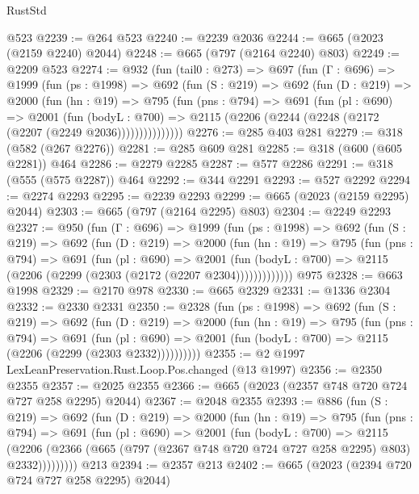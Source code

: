 \begin{lexlean}{RustStd}
\begin{coremodule}
    @523
@2239 := @264 @523
@2240 := @2239 @2036
@2244 := @665 (@2023 (@2159 @2240) @2044)
@2248 := @665 (@797 (@2164 @2240) @803)
@2249 := @2209 @523
@2274 := @932
    (fun (tail0 : @273) =>
    @697
      (fun (Γ : @696) =>
      @1999
        (fun (ps : @1998) =>
        @692
          (fun (S : @219) =>
          @692
            (fun (D : @219) =>
            @2000
              (fun (hn : @19) =>
              @795
                (fun (pns : @794) =>
                @691
                  (fun (pl : @690) =>
                  @2001
                    (fun (bodyL : @700) =>
                    @2115 (@2206 (@2244 (@2248 (@2172 (@2207 (@2249 @2036)))))))))))))))
@2276 := @285 @403 @281
@2279 := @318 (@582 (@267 @2276))
@2281 := @285 @609 @281
@2285 := @318 (@600 (@605 @2281)) @464
@2286 := @2279 @2285
@2287 := @577 @2286
@2291 := @318 (@555 (@575 @2287)) @464
@2292 := @344 @2291
@2293 := @527 @2292
@2294 := @2274 @2293
@2295 := @2239 @2293
@2299 := @665 (@2023 (@2159 @2295) @2044)
@2303 := @665 (@797 (@2164 @2295) @803)
@2304 := @2249 @2293
@2327 := @950
    (fun (Γ : @696) =>
    @1999
      (fun (ps : @1998) =>
      @692
        (fun (S : @219) =>
        @692
          (fun (D : @219) =>
          @2000
            (fun (hn : @19) =>
            @795
              (fun (pns : @794) =>
              @691
                (fun (pl : @690) =>
                @2001
                  (fun (bodyL : @700) => @2115 (@2206 (@2299 (@2303 (@2172 (@2207 @2304)))))))))))))
    @975
@2328 := @663 @1998
@2329 := @2170 @978
@2330 := @665 @2329
@2331 := @1336 @2304
@2332 := @2330 @2331
@2350 := @2328
    (fun (ps : @1998) =>
    @692
      (fun (S : @219) =>
      @692
        (fun (D : @219) =>
        @2000
          (fun (hn : @19) =>
          @795
            (fun (pns : @794) =>
            @691
              (fun (pl : @690) =>
              @2001 (fun (bodyL : @700) => @2115 (@2206 (@2299 (@2303 @2332))))))))))
@2355 := @2 @1997 LexLeanPreservation.Rust.Loop.Pos.changed (@13 @1997)
@2356 := @2350 @2355
@2357 := @2025 @2355
@2366 := @665 (@2023 (@2357 @748 @720 @724 @727 @258 @2295) @2044)
@2367 := @2048 @2355
@2393 := @886
    (fun (S : @219) =>
    @692
      (fun (D : @219) =>
      @2000
        (fun (hn : @19) =>
        @795
          (fun (pns : @794) =>
          @691
            (fun (pl : @690) =>
            @2001
              (fun (bodyL : @700) =>
              @2115
                (@2206
                  (@2366 (@665 (@797 (@2367 @748 @720 @724 @727 @258 @2295) @803) @2332)))))))))
    @213
@2394 := @2357 @213
@2402 := @665 (@2023 (@2394 @720 @724 @727 @258 @2295) @2044)

\end{coremodule}
\end{lexlean}
